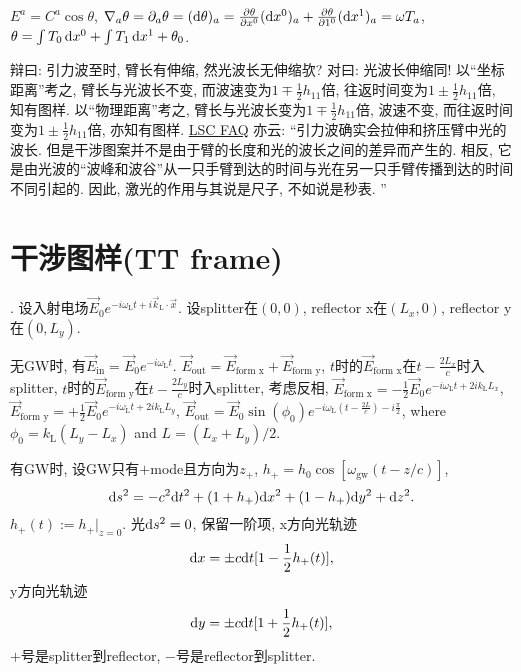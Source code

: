 $E^a=C^a\cos\theta$, $\nabla_a\theta=\partial_a\theta=(\mathrm{d}\theta)_a=\frac{\partial\theta}{\partial x^0}(\mathrm{d} x^0)_a+\frac{\partial\theta}{\partial 1^0}(\mathrm{d} x^1)_a=\omega T_a$, $\theta=\int T_0\,\mathrm{d} x^0+\int T_1\,\mathrm{d} x^1+\theta_0$.

辩曰: 引力波至时, 臂长有伸缩, 然光波长无伸缩欤? 对曰: 光波长伸缩同! 以``坐标距离''考之, 臂长与光波长不变, 而波速变为$1\mp\frac{1}{2}h_{11}$倍, 往返时间变为$1\pm\frac{1}{2}h_{11}$倍, 知有图样. 以``物理距离''考之, 臂长与光波长变为$1\mp\frac{1}{2}h_{11}$倍, 波速不变, 而往返时间变为$1\pm\frac{1}{2}h_{11}$倍, 亦知有图样. \href{https://www.ligo.org/science/faq.php}{LSC FAQ} 亦云: ``引力波确实会拉伸和挤压臂中光的波长. 但是干涉图案并不是由于臂的长度和光的波长之间的差异而产生的. 相反, 它是由光波的``波峰和波谷''从一只手臂到达的时间与光在另一只手臂传播到达的时间不同引起的. 因此, 激光的作用与其说是尺子, 不如说是秒表. ''

\section{干涉图样(TT frame)}\label{TT_explanation}

\cite{Maggiore2014}. 设入射电场$\vec{E}_0e^{-i\omega_\text{L}t+i\vec{k}_\text{L}\cdot\vec{x}}$. 设splitter在$(0,0)$, reflector x在$(L_x,0)$, reflector y在$(0,L_y)$.

无GW时, 有$\vec{E}_\text{in}=\vec{E}_0e^{-i\omega_\text{L}t}$. $\vec{E}_\text{out}=\vec{E}_\text{form x}+\vec{E}_\text{form y}$, $t$时的$\vec{E}_\text{form x}$在$t-\frac{2L_x}{c}$时入splitter, $t$时的$\vec{E}_\text{form y}$在$t-\frac{2L_y}{c}$时入splitter, 考虑反相, $\vec{E}_\text{form x}=-\frac{1}{2}\vec{E}_0e^{-i\omega_\text{L}t+2ik_\text{L}L_x}$, $\vec{E}_\text{form y}=+\frac{1}{2}\vec{E}_0e^{-i\omega_\text{L}t+2ik_\text{L}L_y}$, $\vec{E}_\text{out}=\vec{E}_0\sin(\phi_0)e^{-i\omega_\text{L}(t-\frac{2L}{c})-i\frac{\pi}{2}}$, where $\phi_0=k_\text{L}(L_y-L_x)$ and $L=(L_x+L_y)/2$.

有GW时, 设GW只有$+$mode且方向为$z_+$, $h_+=h_0\cos[\omega_\text{gw}(t-z/c)]$, 
\begin{equation}
    \mathrm{d} s^2=-c^2\mathrm{d} t^2+(1 +h_+)\mathrm{d} x^2+ (1-h_+)\mathrm{d} y^2+\mathrm{d} z^2.
\end{equation}
$h_+(t):=h_+|_{z=0}$. 光$\mathrm{d} s^2=0$, 保留一阶项, x方向光轨迹
\begin{equation}
    \mathrm{d} x=\pm c\mathrm{d} t[1-\frac{1}{2}h_+(t)],
\end{equation}
y方向光轨迹
\begin{equation}
    \mathrm{d} y=\pm c\mathrm{d} t[1+\frac{1}{2}h_+(t)],
\end{equation}
$+$号是splitter到reflector, $-$号是reflector到splitter. 


